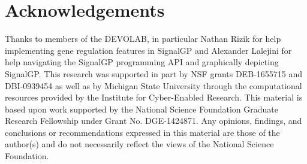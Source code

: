 \section{Acknowledgements}

Thanks to members of the DEVOLAB, in particular Nathan Rizik for help implementing gene regulation features in SignalGP and Alexander Lalejini for help navigating the SignalGP programming API and graphically depicting SignalGP.
This research was supported in part by NSF grants DEB-1655715 and DBI-0939454 as well as by Michigan State University through the computational resources provided by the Institute for Cyber-Enabled Research.
This material is based upon work supported by the National Science Foundation Graduate Research Fellowship under Grant No. DGE-1424871.
Any opinions, findings, and conclusions or recommendations expressed in this material are those of the author(s) and do not necessarily reflect the views of the National Science Foundation.
